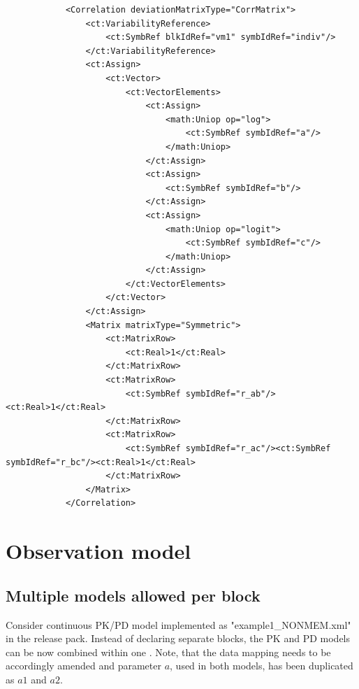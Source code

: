 \begin{itemize}
\lstset{language=XML}
\begin{lstlisting}
            <Correlation deviationMatrixType="CorrMatrix">
                <ct:VariabilityReference>
                    <ct:SymbRef blkIdRef="vm1" symbIdRef="indiv"/>
                </ct:VariabilityReference>
                <ct:Assign>
                    <ct:Vector>
                        <ct:VectorElements>
                            <ct:Assign>
                                <math:Uniop op="log">
                                    <ct:SymbRef symbIdRef="a"/>
                                </math:Uniop>
                            </ct:Assign>
                            <ct:Assign>
                                <ct:SymbRef symbIdRef="b"/>
                            </ct:Assign>
                            <ct:Assign>
                                <math:Uniop op="logit">
                                    <ct:SymbRef symbIdRef="c"/>
                                </math:Uniop>
                            </ct:Assign>
                        </ct:VectorElements>
                    </ct:Vector>
                </ct:Assign>
                <Matrix matrixType="Symmetric">
                    <ct:MatrixRow>
                        <ct:Real>1</ct:Real>
                    </ct:MatrixRow>
                    <ct:MatrixRow>
                        <ct:SymbRef symbIdRef="r_ab"/><ct:Real>1</ct:Real>
                    </ct:MatrixRow>
                    <ct:MatrixRow>
                        <ct:SymbRef symbIdRef="r_ac"/><ct:SymbRef symbIdRef="r_bc"/><ct:Real>1</ct:Real>
                    </ct:MatrixRow>
                </Matrix>
            </Correlation>
\end{lstlisting}

\end{itemize}



\section{Observation model}
\label{sec:obsModel}
\subsection{Multiple models allowed per block}

Consider continuous PK/PD model implemented as "example1\_NONMEM.xml" 
in the release pack. Instead of declaring separate blocks, the PK and PD models 
can be now combined within one . 
Note, that the data mapping needs to be accordingly amended and parameter $a$, 
used in both models, has been duplicated as $a1$ and $a2$.


